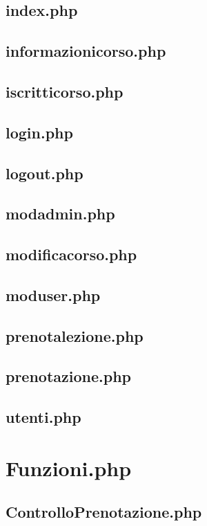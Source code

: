 \subsection{index.php}

\subsection{informazionicorso.php}

\subsection{iscritticorso.php}

\subsection{login.php}

\subsection{logout.php}

\subsection{modadmin.php}

\subsection{modificacorso.php}

\subsection{moduser.php}

\subsection{prenotalezione.php}

\subsection{prenotazione.php}

\subsection{utenti.php}

\section{Funzioni.php}

\subsection{ControlloPrenotazione.php}